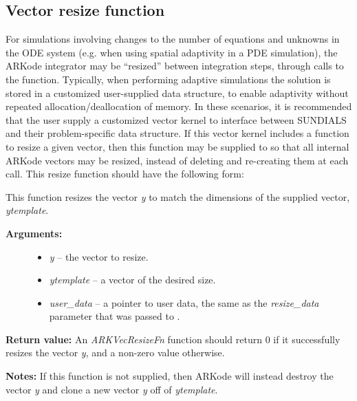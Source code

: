 \documentclass[letterpaper,10pt,english]{sphinxmanual}
\begin{document}
\subsection{Vector resize function}
\label{c_interface/User_supplied:cinterface-vecresizefn}\label{c_interface/User_supplied:vector-resize-function}
For simulations involving changes to the number of equations and
unknowns in the ODE system (e.g. when using spatial adaptivity in a
PDE simulation), the ARKode integrator may be ``resized'' between
integration steps, through calls to the {\hyperref[c_interface/User_callable:ARKodeResize]{}}
function. Typically, when performing adaptive simulations the solution
is stored in a customized user-supplied data structure, to enable
adaptivity without repeated allocation/deallocation of memory.  In
these scenarios, it is recommended that the user supply a customized
vector kernel to interface between SUNDIALS and their problem-specific
data structure.  If this vector kernel includes a function to resize a
given vector, then this function may be supplied to
{\hyperref[c_interface/User_callable:ARKodeResize]{}} so that all internal ARKode vectors may be
resized, instead of deleting and re-creating them at each call.  This
resize function should have the following form:

\begin{fulllineitems}
\label{c_interface/User_supplied:ARKVecResizeFn}
This function resizes the vector \emph{y} to match the dimensions of the
supplied vector, \emph{ytemplate}.
\begin{description}
\item[{\textbf{Arguments:}}] \leavevmode\begin{itemize}
\item {} 
\emph{y} -- the vector to resize.

\item {} 
\emph{ytemplate} -- a vector of the desired size.

\item {} 
\emph{user\_data} -- a pointer to user data, the same as the
\emph{resize\_data} parameter that was passed to {\hyperref[c_interface/User_callable:ARKodeResize]{}}.

\end{itemize}

\end{description}

\textbf{Return value:}
An \emph{ARKVecResizeFn} function should return 0 if it successfully
resizes the vector \emph{y}, and a non-zero value otherwise.

\textbf{Notes:}  If this function is not supplied, then ARKode will
instead destroy the vector \emph{y} and clone a new vector \emph{y} off of
\emph{ytemplate}.

\end{fulllineitems}
\end{document}
